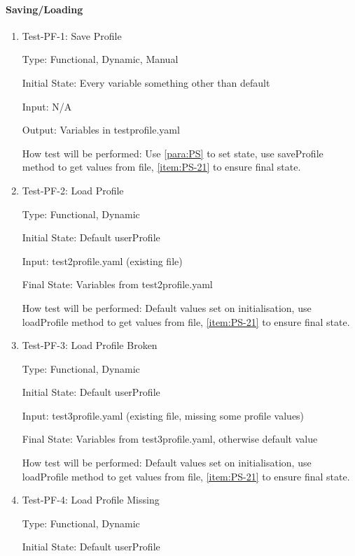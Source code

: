 \documentclass[12pt, titlepage]{article}
\makeatletter
\def\itemlabel#1#2{\def\@currentlabel{#2}\phantomsection\label{#1}}
\makeatother
\begin{document}
\paragraph{Saving/Loading} \itemlabel{para:PF}{PF Tests} %

\begin{enumerate}
\item{Test-PF-1: Save Profile\\}

Type: Functional, Dynamic, Manual

Initial State: Every variable something other than default
	
Input: N/A

Output: Variables in testprofile.yaml

How test will be performed: Use \ref{para:PS} to set state, use saveProfile method to get values from file, \ref{item:PS-21} to ensure final state.
\item{Test-PF-2: Load Profile\\}

Type: Functional, Dynamic

Initial State: Default userProfile
	
Input: test2profile.yaml (existing file)

Final State: Variables from test2profile.yaml

How test will be performed: Default values set on initialisation, use loadProfile method to get values from file, \ref{item:PS-21} to ensure final state.
\item{Test-PF-3: Load Profile Broken\\}

Type: Functional, Dynamic

Initial State: Default userProfile
	
Input: test3profile.yaml (existing file, missing some profile values)

Final State: Variables from test3profile.yaml, otherwise default value

How test will be performed: Default values set on initialisation, use loadProfile method to get values from file, \ref{item:PS-21} to ensure final state.
\item{Test-PF-4: Load Profile Missing\\}

Type: Functional, Dynamic

Initial State: Default userProfile
	

\end{enumerate}
\end{document}
